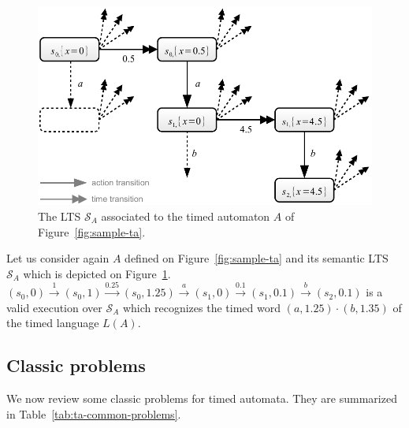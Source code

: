 \begin{figure}[htbp]
    \centering
    \includegraphics[width=\textwidth]{content/timed-automata/semantic-lts}
    \caption{The LTS $\mathcal{S}_A$ associated to the timed automaton $A$ of Figure~\ref{fig:sample-ta}.}
    \label{fig:semantic-lts}
\end{figure}

Let us consider again $A$ defined on Figure~\ref{fig:sample-ta} and its semantic LTS $\mathcal{S}_A$ which is depicted on Figure~\ref{fig:semantic-lts}. $(s_0, 0) \stackrel{1}{\longrightarrow} (s_0, 1) \stackrel{0.25}{\longrightarrow} (s_0, 1.25) \stackrel{a}{\longrightarrow} (s_1, 0) \stackrel{0.1}{\longrightarrow} (s_1, 0.1) \stackrel{b}{\longrightarrow} (s_2, 0.1)$ is a valid execution over $\mathcal{S}_A$ which recognizes the timed word $(a, 1.25) \cdot (b, 1.35)$ of the timed language $L(A)$.


\subsection{Classic problems}


We now review some classic problems for timed automata. They are summarized in Table~\ref{tab:ta-common-problems}.

